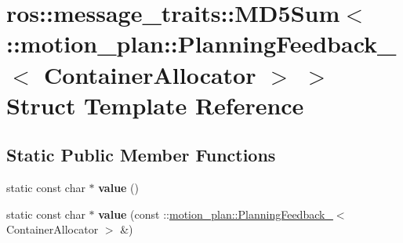 \hypertarget{structros_1_1message__traits_1_1MD5Sum_3_01_1_1motion__plan_1_1PlanningFeedback___3_01ContainerAllocator_01_4_01_4}{}\section{ros\+:\+:message\+\_\+traits\+:\+:M\+D5\+Sum$<$ \+:\+:motion\+\_\+plan\+:\+:Planning\+Feedback\+\_\+$<$ Container\+Allocator $>$ $>$ Struct Template Reference}
\label{structros_1_1message__traits_1_1MD5Sum_3_01_1_1motion__plan_1_1PlanningFeedback___3_01ContainerAllocator_01_4_01_4}
\subsection*{Static Public Member Functions}
\begin{DoxyCompactItemize}
\item 
\mbox{\label{structros_1_1message__traits_1_1MD5Sum_3_01_1_1motion__plan_1_1PlanningFeedback___3_01ContainerAllocator_01_4_01_4_a0132bd41fd43098e95825b5ae77a00f6}} 
static const char $\ast$ {\bfseries value} ()
\item 
\mbox{\label{structros_1_1message__traits_1_1MD5Sum_3_01_1_1motion__plan_1_1PlanningFeedback___3_01ContainerAllocator_01_4_01_4_a12d83ccefcea9a6701098a1e423fcdf2}} 
static const char $\ast$ {\bfseries value} (const \+::\hyperlink{structmotion__plan_1_1PlanningFeedback__}{motion\+\_\+plan\+::\+Planning\+Feedback\+\_\+}$<$ Container\+Allocator $>$ \&)
\end{DoxyCompactItemize}
